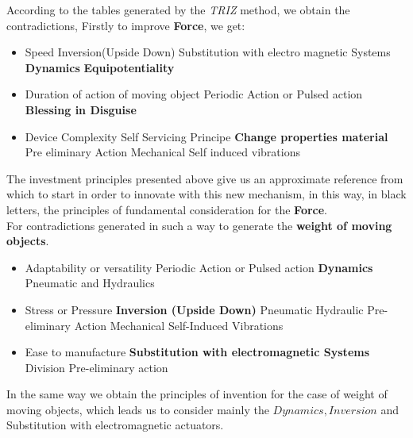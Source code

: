 \documentclass[12pt, twoside]{report}
\begin{document}
According to the tables generated by the \textit{TRIZ} method, we obtain the contradictions, Firstly to improve \textbf{Force}, we get:
\begin{itemize}
    \item Speed
   \subitem Inversion(Upside Down) 
   \subitem Substitution with electro magnetic Systems
   \subitem \textbf{Dynamics}
   \subitem \textbf{Equipotentiality}
    \item Duration of action of moving object
    \subitem Periodic Action or Pulsed action
    \subitem \textbf{Blessing in Disguise}
    \item Device Complexity
    \subitem Self Servicing Principe
    \subitem \textbf{Change properties material}
    \subitem Pre eliminary Action
    \subitem Mechanical Self induced vibrations
\end{itemize}
The investment principles presented above give us an approximate reference from which to start in order to innovate with this new mechanism, in this way, in black letters, the principles of fundamental consideration for the \textbf{Force}.\\

For contradictions generated in such a way to generate the \textbf{weight of moving objects}.
\begin{itemize}
    \item Adaptability or versatility
    \subitem Periodic Action or Pulsed action
    \subitem \textbf{Dynamics}
    \subitem Pneumatic and Hydraulics
    
    \item Stress or Pressure
    \subitem \textbf{Inversion (Upside Down)}
    \subitem Pneumatic Hydraulic
    \subitem Pre-eliminary Action
    \subitem Mechanical Self-Induced Vibrations
    \item Ease to manufacture
    \subitem \textbf{Substitution with electromagnetic Systems}
    \subitem Division
    \subitem Pre-eliminary action
\end{itemize}
In the same way we obtain the principles of invention for the case of weight of moving objects, which leads us to consider mainly the $Dynamics, Inversion$ and Substitution with electromagnetic actuators.
\end{document}
